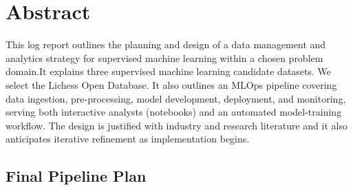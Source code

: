 \documentclass[11pt,a4paper]{report}
\begin{document}

\hypersetup{pageanchor=false}

\hypersetup{pageanchor=true}
\cleardoublepage

\chapter*{Abstract}
{}

This log report outlines the planning and design of a data management and analytics strategy for supervised machine learning within a chosen problem domain.It explains three supervised machine learning candidate datasets. We select the Lichess Open Database. It also outlines an MLOps pipeline covering data ingestion, pre-processing, model development, deployment, and monitoring, serving both interactive analysts (notebooks) and an automated model-training workflow. The design is justified with industry and research literature and it also anticipates iterative refinement as implementation begins.


\tableofcontents
\clearpage

\listoffigures
\listoftables
\clearpage





\section{Final Pipeline Plan}
















\appendix

\begingroup
\singlespacing
\small
\setlength{\parskip}{0.25ex plus 0.1ex}
\makeatletter
\renewcommand\section{\@startsection{section}{1}{\z@}{-0.75ex \@plus -0.2ex}{0.4ex}{\normalfont\bfseries\small}}
\makeatother


\endgroup

\printbibliography[heading=bibintoc]
\end{document}
